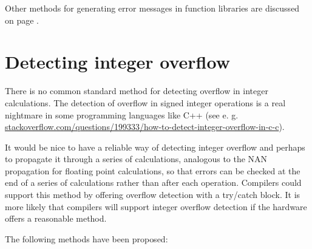 \documentclass[forwardcom.tex]{subfiles}
\begin{document}
Other methods for generating error messages in function libraries are discussed on page \pageref{errorMessageHandling}.
\vspace{2mm}


\section{Detecting integer overflow} 
\label{integerOverflowDetection}
There is no common standard method for detecting overflow in integer calculations. The detection of overflow in signed integer operations is a real nightmare in some programming languages like C++ (see e. g. 
\href{http://stackoverflow.com/questions/199333/how-to-detect-integer-overflow-in-c-c}{stackoverflow.com/questions/199333/how-to-detect-integer-overflow-in-c-c}).
\vspace{2mm}

It would be nice to have a reliable way of detecting integer overflow and perhaps to propagate it through a series of calculations, analogous to the NAN propagation for floating point calculations, so that errors can be checked at the end of a series of calculations rather than after each operation. Compilers could support this method by offering overflow detection with a try/catch block. It is more likely that compilers will support integer overflow detection if the hardware offers a reasonable method.
\vspace{2mm}

The following methods have been proposed:
\end{document}
